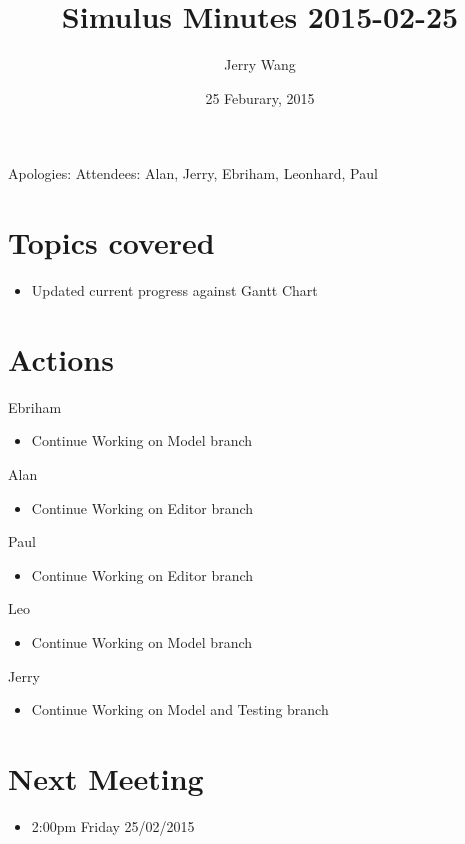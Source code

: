 \documentclass{article}
\author {Jerry Wang}
\title{Simulus Minutes 2015-02-25}
\date {25 Feburary, 2015}
\begin{document}
\maketitle




\noindent Apologies: 
\newline 
Attendees: Alan, Jerry, Ebriham, Leonhard, Paul


\section {Topics covered}
\begin{itemize}
\item  Updated current progress against Gantt Chart
\end{itemize}


\section {Actions}
Ebriham 
\begin{itemize}
\item Continue Working on Model branch
\end{itemize}

\noindent
Alan
\begin{itemize}
\item Continue Working on Editor branch
     
\end{itemize}

\noindent
Paul
\begin{itemize}
\item Continue Working on Editor branch
\end{itemize}

\noindent
Leo 
\begin{itemize}
\item Continue Working on Model branch
\end{itemize}

\noindent
Jerry
\begin{itemize}
\item Continue Working on Model and Testing branch
\end{itemize}



\section {Next Meeting}
\begin{itemize}
\item  2:00pm Friday 25/02/2015

\end{itemize}
\end{document}
